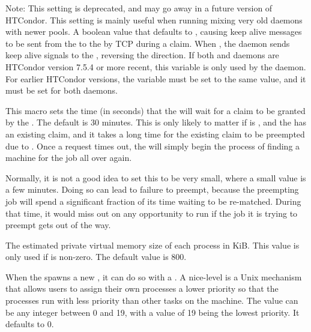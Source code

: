 \begin{description}
\label{param:StartdSendsAlives}
\item[\Macro{STARTD\_SENDS\_ALIVES}]
  Note:  This setting is deprecated, and may go away in a future version
  of HTCondor. This setting is mainly useful when running mixing very
  old  daemons with newer pools.
  A boolean value that defaults to ,
  causing keep alive messages to be sent from the  to the
   by TCP during a claim.
  When , the  daemon sends keep alive signals
  to the , reversing the direction.
  If both  and  daemons are HTCondor version 7.5.4
  or more recent, this variable is only used by the  daemon.
  For earlier HTCondor versions, the variable must be set to the same value,
  and it must be set for both daemons.

\label{param:RequestClaimTimeout}
\item[\Macro{REQUEST\_CLAIM\_TIMEOUT}]
  This macro sets the time (in
  seconds) that the  will wait for a claim to be granted by the
  .  The default is 30 minutes.  This is only likely to matter
  if  is , and the
   has an existing claim, and it takes a long time for the
  existing claim to be preempted due to .
  Once a request times out, the  will simply begin the process
  of finding a machine for the job all over again.

  Normally, it is not a good idea to set this to be very small, 
  where a small value is a few minutes.  
  Doing so can lead to failure to preempt, because the
  preempting job will spend a significant fraction of its time waiting
  to be re-matched.  During that time, it would miss out on any
  opportunity to run if the job it is trying to preempt gets out of
  the way.

\label{param:ShadowSizeEstimate}
\item[\Macro{SHADOW\_SIZE\_ESTIMATE}]
  The estimated private virtual memory size of each
   process in  KiB.
  This value is only used if  is non-zero.
  The default value is 800.

\label{param:ShadowReniceIncrement}
\item[\Macro{SHADOW\_RENICE\_INCREMENT}]
  When the  spawns a new
  , it can do so with a .  A
  nice-level is a Unix mechanism that allows users to assign their own
  processes a lower priority so that the processes run with less
  priority than other tasks on the machine.  The value can be any
  integer between 0 and 19, with a value of 19 being the lowest
  priority.  It defaults to 0.


\end{description}
